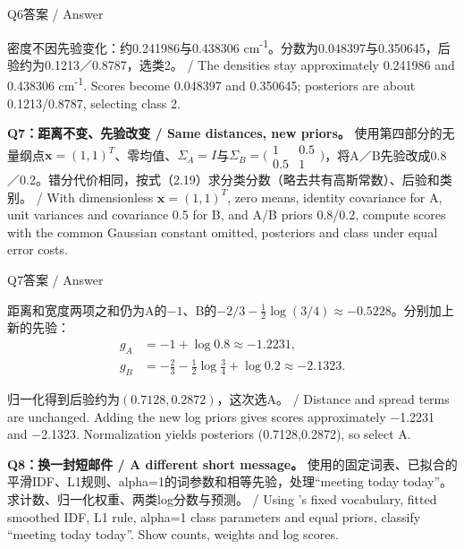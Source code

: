 \begin{StudySolution}{Q6答案 / Answer}


密度不因先验变化：约0.241986与0.438306 cm\textsuperscript{-}\textsuperscript{1}。分数为0.048397与0.350645，后验约为0.1213／0.8787，选类2。 / The densities stay approximately 0.241986 and 0.438306 cm\textsuperscript{-}\textsuperscript{1}. Scores become 0.048397 and 0.350645; posteriors are about 0.1213/0.8787, selecting class 2.


\end{StudySolution}


\textbf{Q7：距离不变、先验改变 / Same distances, new priors。} 使用第四部分的无量纲点\(\mathbf x=(1,1)^T\)、零均值、\(\Sigma_A=I\)与\(\Sigma_B=\bigl(\begin{smallmatrix}1&0.5\\0.5&1\end{smallmatrix}\bigr)\)，将A／B先验改成0.8／0.2。错分代价相同，按式（2.19）求分类分数（略去共有高斯常数）、后验和类别。 / With dimensionless \(\mathbf x=(1,1)^T\), zero means, identity covariance for A, unit variances and covariance 0.5 for B, and A/B priors 0.8/0.2, compute scores with the common Gaussian constant omitted, posteriors and class under equal error costs.



\begin{StudySolution}{Q7答案 / Answer}


距离和宽度两项之和仍为A的\(-1\)、B的\(-2/3-\tfrac12\log(3/4)\approx-0.5228\)。分别加上新的先验：
\[
\begin{aligned}
g_A&=-1+\log0.8\approx-1.2231,\\
g_B&=-\frac23-\frac12\log\frac34+\log0.2\approx-2.1323.
\end{aligned}
\tag{2.35b}
\]


归一化得到后验约为\((0.7128,0.2872)\)，这次选A。 / Distance and spread terms are unchanged. Adding the new log priors gives scores approximately \ensuremath{-}1.2231 and \ensuremath{-}2.1323. Normalization yields posteriors (0.7128,0.2872), so select A.


\end{StudySolution}


\textbf{Q8：换一封短邮件 / A different short message。} 使用的固定词表、已拟合的平滑IDF、L1规则、alpha=1的词参数和相等先验，处理“meeting today today”。求计数、归一化权重、两类log分数与预测。 / Using 's fixed vocabulary, fitted smoothed IDF, L1 rule, alpha=1 class parameters and equal priors, classify “meeting today today”. Show counts, weights and log scores.



